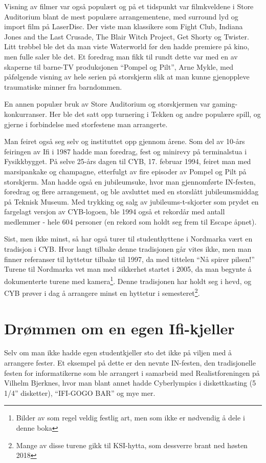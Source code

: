 Visning av filmer var også populært og på et tidspunkt var filmkveldene i Store Auditorium blant de mest populære arrangementene, med surround lyd og import film på LaserDisc. Der viste man klassikere som Fight Club, Indiana Jones and the Last Crusade, The Blair Witch Project, Get Shorty og Twister. Litt trøbbel ble det da man viste Waterworld før den hadde premiere på kino, men fulle saler ble det. Et foredrag man fikk til rundt dette var med en av skaperne til barne-TV produksjonen ``Pompel og Pilt'', Arne Mykle, med påfølgende visning av hele serien på storskjerm slik at man kunne gjenoppleve traumatiske minner fra barndommen.

En annen populær bruk av Store Auditorium og storskjermen var gaming-konkurranser. Her ble det satt opp turnering i Tekken og andre populære spill, og gjerne i forbindelse med storfestene man arrangerte.

Man feiret også seg selv og instituttet opp gjennom årene. Som del av 10-års feiringen av Ifi i 1987 hadde man foredrag, fest og minirevy på terminalstua i Fysikkbygget. På selve 25-års dagen til CYB, 17. februar 1994, feiret man med marsipankake og champagne, etterfulgt av fire episoder av Pompel og Pilt på storskjerm. Man hadde også en jubileumsuke, hvor man gjennomførte IN-festen, foredrag og flere arrangement, og ble avsluttet med en storslått jubileumsmiddag på Teknisk Museum. Med trykking og salg av jubileums-t-skjorter som prydet en fargelagt versjon av CYB-logoen, ble 1994 også et rekordår med antall medlemmer - hele 604 personer (en rekord som holdt seg frem til Escape åpnet).

Sist, men ikke minst, så har også turer til studenthyttene i Nordmarka vært en tradisjon i CYB. Hvor langt tilbake denne tradisjonen går vites ikke, men man finner referanser til hyttetur tilbake til 1997, da med tittelen ``Nå spirer pilsen!'' Turene til Nordmarka vet man med sikkerhet startet i 2005, da man begynte å dokumenterte turene med kamera\footnote{Bilder av som regel veldig festlig art, men som ikke er nødvendig å dele i denne boka}. Denne tradisjonen har holdt seg i hevd, og CYB prøver i dag å arrangere minst en hyttetur i semesteret\footnote{Mange av disse turene gikk til KSI-hytta, som dessverre brant ned høsten 2018}.

\section{Drømmen om en egen Ifi-kjeller}

Selv om man ikke hadde egen studentkjeller sto det ikke på viljen med å arrangere fester. Et eksempel på dette er den nevnte IN-festen, den tradisjonelle festen for informatikerne som ble arrangert i samarbeid med Realistforeningen på Vilhelm Bjerknes, hvor man blant annet hadde Cyberlympics i diskettkasting (5 1/4'' disketter), ``IFI-GOGO BAR'' og mye mer. 

